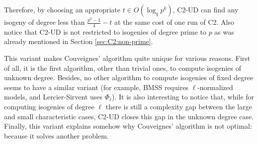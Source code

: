 Therefore, by choosing an appropriate $t\in O(\log_q p^k)$, C2-UD can
find any isogeny of degree less than $\frac{p^k-1}{4}-t$ at the same
cost of one run of C2. Also notice that C2-UD is not restricted to
isogenies of degree prime to $p$ as was already mentioned in Section
\ref{sec:C2:non-prime}.

This variant makes Couveignes' algorithm quite unique for various
reasons. First of all, it is the first algorithm, other than trivial
ones, to compute isogenies of unknown degree. Besides, no other
algorithm to compute isogenies of fixed degree seems to have a similar
variant (for example, BMSS requires $\ell$-normalized models, and
Lercier-Sirvent uses $\Phi_\ell$). It is also interesting to notice
that, while for computing isogenies of degree $\ell$ there is still a
complexity gap between the large and small characteristic cases, C2-UD
closes this gap in the unknown degree case. Finally, this variant
explains somehow why Couveignes' algorithm is not optimal: because it
solves another problem.




%
